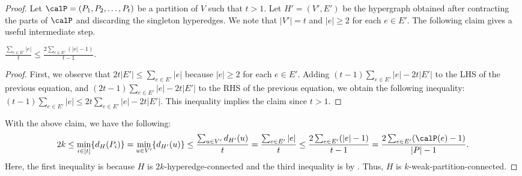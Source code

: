 \begin{proof}
    Let $\calP = (P_1, P_2, \ldots, P_t)$ %
    be a partition of $V$ such that $t > 1$.
    Let $H' = (V', E')$ be the hypergraph obtained after contracting the parts of $\calP$ and discarding the singleton hyperedges. We note that $|V'| = t$ and $|e| \geq 2$ for each $e \in E'$. 
    The following claim gives a useful intermediate step.
    \begin{claim} \label{claim:weak-partition-conn-vs-min-cut}
        $\frac{\sum_{e \in E'}|e|}{t} \leq \frac{2\sum_{e \in E'}(|e| - 1)}{t - 1}.$
    \end{claim}
    \begin{proof}
    First, we observe that $2t|E'| \leq \sum_{e\in E'}|e|$ because $|e| \geq 2$ for each $e \in E'$.  
    Adding $(t-1)\sum_{e \in E'}|e| - 2t|E'|$ to the LHS of the previous equation, and $(2t-1)\sum_{e \in E'}|e| - 2t|E'|$ to the RHS of the previous equation, we obtain the following inequality: $(t-1)\sum_{e \in E'}|e| \leq 2t\sum_{e \in E'}|e| - 2t|E'|$.
    This inequality implies the claim since $t>1$. 
    \end{proof}
    With the above claim, we have the following:
$$2k \leq \min_{i \in [t]}\{d_{H}(P_i)\} 
            = \min_{u \in V'}\{d_{H'}(u)\}
            \leq \frac{\sum_{u \in V'}d_{H'}(u)}{t}
            = \frac{\sum_{e \in E'}|e|}{t}
            \leq \frac{2\sum_{e \in E'}(|e| - 1)}{t - 1}
            =  \frac{2\sum_{e \in E'}(\calP(e) - 1)}{|P| - 1}.$$
    Here, the first inequality is because $H$ is $2k$-hyperedge-connected and the third inequality is by . Thus, $H$ is $k$-weak-partition-connected.
\end{proof}

